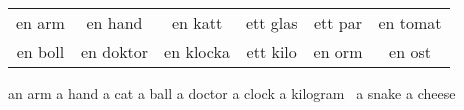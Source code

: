 \begin{center}
    \begin{tabular}{|c c c c c c|}
        \hline
        en arm & en hand & en katt & ett glas & ett par & en tomat \\
        en boll & en doktor & en klocka & ett kilo & en orm & en ost \\
        \hline
    \end{tabular}
\end{center}

\begin{questions}
    \begin{multicols}{3}
        \raggedcolumns
        \question an arm \fillin
        \question a hand \fillin
        \question a cat \fillin
        \question a ball \fillin
        \question a doctor \fillin
        \question a clock \fillin
        \question a kilogram \fillin
        \question a snake \fillin
        \question a cheese \fillin
    \end{multicols}
\end{questions}
